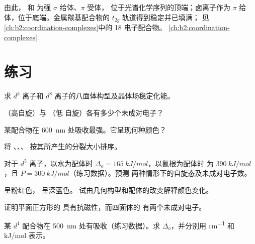 由此， 和  为强 $\sigma$ 给体、$\pi$ 受体，
位于光谱化学序列的顶端；卤离子作为 $\pi$ 给体，位于底端。金属羰基配合物的 $t_{2g}$ 轨道得到稳定并已填满；
见\cref{ch:b2:coordination-complexes}中的 18 电子配合物。
\cref{ch:b2:coordination-complexes}.

\section{练习}

\begin{exercise}[$\star$]\label{exo:b2:ligand-field:1}
求 $d^3$ 离子和 $d^8$ 离子的八面体构型及晶体场稳定化能。
\end{exercise}

\begin{exercise}[$\star$]\label{exo:b2:ligand-field:2}
（高自旋）与 （低
自旋）各有多少个未成对电子？
\end{exercise}

\begin{exercise}[$\star$]\label{exo:b2:ligand-field:3}
某配合物在 \qty{600}{nm} 处吸收最强。它呈现何种颜色？
\end{exercise}

\begin{exercise}[$\star$]\label{exo:b2:ligand-field:4}
将 、、、 按其所产生的分裂大小排序。
\end{exercise}

\begin{exercise}[$\star\star$]\label{exo:b2:ligand-field:5}
对于 $d^5$ 离子，以水为配体时 $\Delta_o = \qty{165}{kJ/mol}$，以氰根为配体时
为 $\qty{390}{kJ/mol}$，且 $P = \qty{300}{kJ/mol}$（练习数据）。预测
两种情形下的自旋态及未成对电子数。
\end{exercise}

\begin{exercise}[$\star\star$]\label{exo:b2:ligand-field:6}
 呈粉红色， 呈深蓝色。
试由几何构型和配体的改变解释颜色变化。
\end{exercise}

\begin{exercise}[$\star\star$]\label{exo:b2:ligand-field:7}
证明平面正方形的  具有抗磁性，而四面体的
 有两个未成对电子。
\end{exercise}

\begin{exercise}[$\star\star$]\label{exo:b2:ligand-field:8}
某 $d^1$ 配合物在 \qty{500}{nm} 处有吸收（练习数据）。求 $\Delta_o$，并分别用 \unit{cm^{-1}}
和 \unit{kJ/mol} 表示。
\end{exercise}

